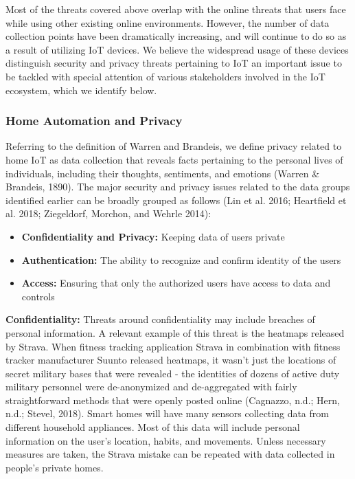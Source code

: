 Most of the threats covered above overlap with the online threats that users face while using other existing online environments. However, the number of data collection points have been dramatically increasing, and will continue to do so as a result of utilizing IoT devices. We believe the widespread usage of these devices distinguish security and privacy threats pertaining to IoT an important issue to be tackled with special attention of various stakeholders involved in the IoT ecosystem, which we identify below.

\subsubsection{Home Automation and Privacy}
Referring to the definition of Warren and Brandeis, we define privacy related to home IoT as data collection that reveals facts pertaining to the personal lives of individuals, including their thoughts, sentiments, and emotions (Warren \& Brandeis, 1890). The major security and privacy issues related to the data groups identified earlier can be broadly grouped as follows (Lin et al. 2016; Heartfield et al. 2018; Ziegeldorf, Morchon, and Wehrle 2014):

\begin{itemize}
\item {\bf Confidentiality and Privacy:} Keeping data of users private
\item {\bf Authentication:} The ability to recognize and confirm identity of the users
\item {\bf Access:} Ensuring that only the authorized users have access to data and controls
\end{itemize}

{\bf Confidentiality:} Threats around confidentiality may include breaches of personal information. A relevant example of this threat is the heatmaps released by Strava. When fitness tracking application Strava in combination with fitness tracker manufacturer Suunto released heatmaps, it wasn’t just the locations of secret military bases that were revealed - the identities of dozens of active duty military personnel were de-anonymized and de-aggregated with fairly straightforward methods that were openly posted online (Cagnazzo, n.d.; Hern, n.d.; Stevel, 2018). Smart homes will have many sensors collecting data from different household appliances. Most of this data will include personal information on the user’s location, habits, and movements. Unless necessary measures are taken, the Strava mistake can be repeated with data collected in people’s private homes.

